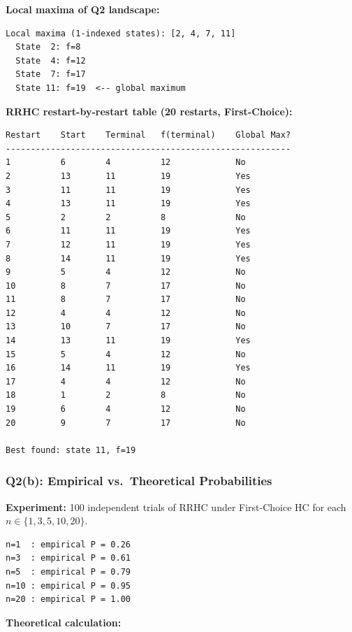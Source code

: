 \documentclass[12pt,a4paper]{article}
\begin{document}
\textbf{Local maxima of Q2 landscape:}

\begin{lstlisting}[style=output]
Local maxima (1-indexed states): [2, 4, 7, 11]
  State  2: f=8
  State  4: f=12
  State  7: f=17
  State 11: f=19  <-- global maximum
\end{lstlisting}

\textbf{RRHC restart-by-restart table (20 restarts, First-Choice):}

\begin{lstlisting}[style=output]
Restart    Start    Terminal   f(terminal)    Global Max?
---------------------------------------------------------
1          6        4          12             No
2          13       11         19             Yes
3          11       11         19             Yes
4          13       11         19             Yes
5          2        2          8              No
6          11       11         19             Yes
7          12       11         19             Yes
8          14       11         19             Yes
9          5        4          12             No
10         8        7          17             No
11         8        7          17             No
12         4        4          12             No
13         10       7          17             No
14         13       11         19             Yes
15         5        4          12             No
16         14       11         19             Yes
17         4        4          12             No
18         1        2          8              No
19         6        4          12             No
20         9        7          17             No

Best found: state 11, f=19
\end{lstlisting}

\subsubsection*{Q2(b): Empirical vs.\ Theoretical Probabilities}

\textbf{Experiment:} 100 independent trials of RRHC under First-Choice HC for
each $n \in \{1, 3, 5, 10, 20\}$.

\begin{lstlisting}[style=output]
n=1  : empirical P = 0.26
n=3  : empirical P = 0.61
n=5  : empirical P = 0.79
n=10 : empirical P = 0.95
n=20 : empirical P = 1.00
\end{lstlisting}

\textbf{Theoretical calculation:}
\end{document}
